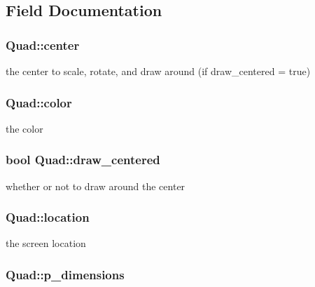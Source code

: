 \subsection{Field Documentation}
\hypertarget{struct_quad_ad41dad5ce3589e5e0a707c306f864c75}{
\subsubsection[{center}]{ Quad\-::center}}\label{struct_quad_ad41dad5ce3589e5e0a707c306f864c75}
the center to scale, rotate, and draw around (if draw\-\_\-centered = true) \hypertarget{struct_quad_aba4cc1411529b22237d51ed7338d7db3}{
\subsubsection[{color}]{ Quad\-::color}}\label{struct_quad_aba4cc1411529b22237d51ed7338d7db3}
the color \hypertarget{struct_quad_a22358ac9a070eb4aa4045ae5f6c98ebf}{
\subsubsection[{draw\-\_\-centered}]{\setlength{\rightskip}{0pt plus 5cm}bool Quad\-::draw\-\_\-centered}}\label{struct_quad_a22358ac9a070eb4aa4045ae5f6c98ebf}
whether or not to draw around the center \hypertarget{struct_quad_a8be8d65aebce0eef50924f79388d2cb1}{
\subsubsection[{location}]{ Quad\-::location}}\label{struct_quad_a8be8d65aebce0eef50924f79388d2cb1}
the screen location \hypertarget{struct_quad_a0783c0afcc8da455608372d89c46a038}{
\subsubsection[{p\-\_\-dimensions}]{ Quad\-::p\-\_\-dimensions}}\label{struct_quad_a0783c0afcc8da455608372d89c46a038}
